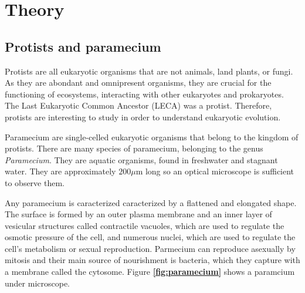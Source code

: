 \section{Theory}

\subsection{Protists and paramecium}

Protists are all eukaryotic organisms that are not animals, land plants, or fungi. As they are abondant and omnipresent organisms, they are crucial for the functioning of ecosystems, interacting with other eukaryotes and prokaryotes. The Last Eukaryotic Common Ancestor (LECA) was a protist. Therefore, protists are interesting to study in order to understand eukaryotic evolution.

Paramecium are single-celled eukaryotic organisms that belong to the kingdom of protists. There are many species of paramecium, belonging to the genus \textit{Paramecium}. They are aquatic organisms, found in freshwater and stagnant water. They are approximately $200 \mu$m long so an optical microscope is sufficient to observe them. 

Any paramecium is caracterized caracterized by a flattened and elongated shape. The surface is formed by an outer plasma membrane and an inner layer of vesicular structures called contractile vacuoles, which are used to regulate the osmotic pressure of the cell, and numerous nuclei, which are used to regulate the cell's metabolism or sexual reproduction. Parmecium can reproduce asexually by mitosis and their main source of nourishment is bacteria, which they capture with a membrane called the cytosome. Figure \textbf{\ref{fig:paramecium}} shows a paramcium under microscope.

\vspace{0.4em}

